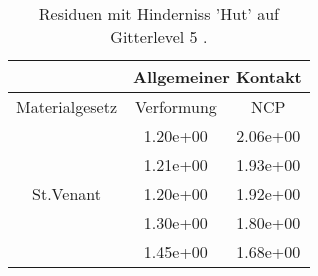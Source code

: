 \begin{table} 
\centering 
\begin{tabular}{c|cc|} 
\cline{2-3} 
 & \multicolumn{2}{|c|}{Allgemeiner Kontakt} \\ 
\hline 
\multicolumn{1}{|c|}{Materialgesetz} & \multicolumn{1}{c|}{Verformung} & \multicolumn{1}{c|}{NCP} \\ 
\hline 
\multicolumn{1}{|c|}{\multirow{5}{*}{St.Venant}} &\multicolumn{1}{|c|}{  1.20e+00} & \multicolumn{1}{|c|}{  2.06e+00} \\ 
\multicolumn{1}{|c|}{} & \multicolumn{1}{|c|}{  1.21e+00} & \multicolumn{1}{|c|}{  1.93e+00} \\ 
\multicolumn{1}{|c|}{} & \multicolumn{1}{|c|}{  1.20e+00} & \multicolumn{1}{|c|}{  1.92e+00} \\ 
\multicolumn{1}{|c|}{} & \multicolumn{1}{|c|}{  1.30e+00} & \multicolumn{1}{|c|}{  1.80e+00} \\ 
\multicolumn{1}{|c|}{} & \multicolumn{1}{|c|}{  1.45e+00} & \multicolumn{1}{|c|}{  1.68e+00} \\ 
\hline 
\end{tabular}\caption{Residuen mit Hinderniss 'Hut' auf Gitterlevel 5 .}\label{tab:Residuum_Hut_level5}
\end{table} 
